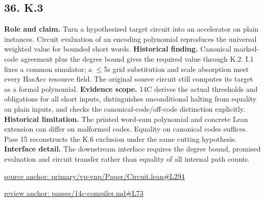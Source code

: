\documentclass[11pt,letterpaper]{article}
\theoremstyle{definition}\newtheorem{definition}[theorem]{Definition}\newtheorem{example}[theorem]{Example}
\theoremstyle{remark}\newtheorem{remark}[theorem]{Remark}
\begin{document}
\subsection*{36. K.3}
\textbf{Role and claim.} Turn a hypothesized target circuit into an accelerator on plain instances. Circuit evaluation of an encoding polynomial reproduces the universal weighted value for bounded short words.
\textbf{Historical finding.} Canonical marked-code agreement plus the degree bound gives the required value through K.2. I.1 fixes a common simulator; a \ensuremath{\le}5s grid substitution and scale absorption meet every HasAcc resource field. The original source circuit still computes its target as a formal polynomial.
\textbf{Evidence scope.} 14C derives the actual thresholds and obligations for all short inputs, distinguishes unconditional halting from equality on plain inputs, and checks the canonical-code/off-code distinction explicitly.
\textbf{Historical limitation.} The printed word-sum polynomial and concrete Lean extension can differ on malformed codes. Equality on canonical codes suffices. Pass 15 reconstructs the K.6 exclusion under the same cutting hypothesis.
\textbf{Interface detail.} The downstream interface requires the degree bound, promised evaluation and circuit transfer rather than equality of all internal path counts.
\par\href{https://github.com/nousentllc/VP-VNP-Review/blob/8a7976933b6b2b4ffda1ad3a0dfb5fc6b6f023e8/primary/vp-vnp/Paper/Circuit.lean\#L294}{source anchor: primary/vp-vnp/Paper/Circuit.lean\#L294}
\par\href{https://github.com/nousentllc/VP-VNP-Review/blob/8a7976933b6b2b4ffda1ad3a0dfb5fc6b6f023e8/passes/14c-compiler.md\#L73}{review anchor: passes/14c-compiler.md\#L73}
\goodbreak
{}
\hypertarget{claim.37}{}
\end{document}
